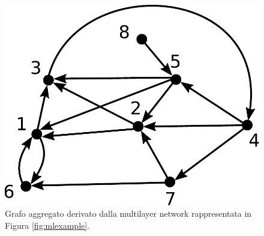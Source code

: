 \begin{figure}
    \centering
    \includegraphics[height=0.15865384615384615\textheight]{img/definitions/aggexample.pdf}
    \caption{Grafo aggregato derivato dalla multilayer network rappresentata in Figura \ref{fig:mlexample}.}
    \label{fig:graggexample}
\end{figure}
